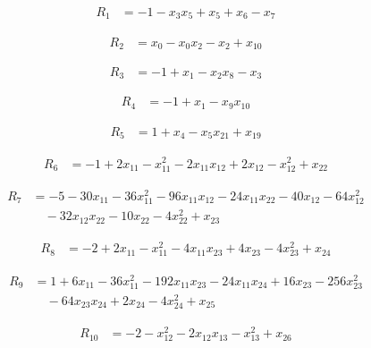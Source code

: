 \documentclass[11pt,letterpaper]{article}
\theoremstyle{definition}
\theoremstyle{remark}
\begin{document}
\begin{align*}
R_{1} &= -1 -x_{3} x_{5} +x_{5} +x_{6} -x_{7}
\end{align*}

\begin{align*}
R_{2} &= x_{0} -x_{0} x_{2} -x_{2} +x_{10}
\end{align*}

\begin{align*}
R_{3} &= -1 +x_{1} -x_{2} x_{8} -x_{3}
\end{align*}

\begin{align*}
R_{4} &= -1 +x_{1} -x_{9} x_{10}
\end{align*}

\begin{align*}
R_{5} &= 1 +x_{4} -x_{5} x_{21} +x_{19}
\end{align*}

\begin{align*}
R_{6} &= -1 +2 x_{11} -x_{11}^{2} -2 x_{11} x_{12} +2 x_{12} -x_{12}^{2} +x_{22}
\end{align*}

\begin{align*}
R_{7} &= -5 -30 x_{11} -36 x_{11}^{2} -96 x_{11} x_{12} -24 x_{11} x_{22} -40 x_{12} -64 x_{12}^{2} \\
&\quad -32 x_{12} x_{22} -10 x_{22} -4 x_{22}^{2} +x_{23}
\end{align*}

\begin{align*}
R_{8} &= -2 +2 x_{11} -x_{11}^{2} -4 x_{11} x_{23} +4 x_{23} -4 x_{23}^{2} +x_{24}
\end{align*}

\begin{align*}
R_{9} &= 1 +6 x_{11} -36 x_{11}^{2} -192 x_{11} x_{23} -24 x_{11} x_{24} +16 x_{23} -256 x_{23}^{2} \\
&\quad -64 x_{23} x_{24} +2 x_{24} -4 x_{24}^{2} +x_{25}
\end{align*}

\begin{align*}
R_{10} &= -2 -x_{12}^{2} -2 x_{12} x_{13} -x_{13}^{2} +x_{26}
\end{align*}
\end{document}
